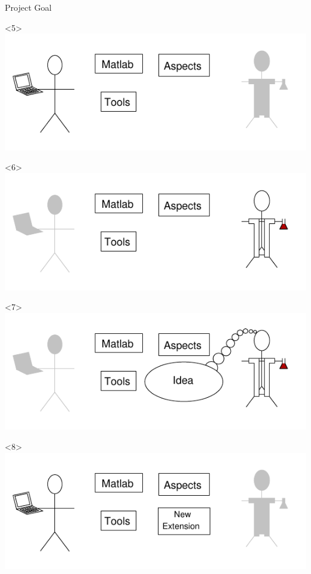\begin{frame}{Project Goal}
\begin{onlyenv}
    \end{onlyenv}
    \begin{onlyenv}<5>
      \includegraphics{images/perspectives4_comp.pdf}
    \end{onlyenv}
    \begin{onlyenv}<6>
      \includegraphics{images/perspectives5_sci.pdf}
    \end{onlyenv}
    \begin{onlyenv}<7>
      \includegraphics{images/perspectives6_sci.pdf}
    \end{onlyenv}
    \begin{onlyenv}<8>
      \includegraphics{images/perspectives7_comp.pdf}

\end{onlyenv}
\end{frame}
